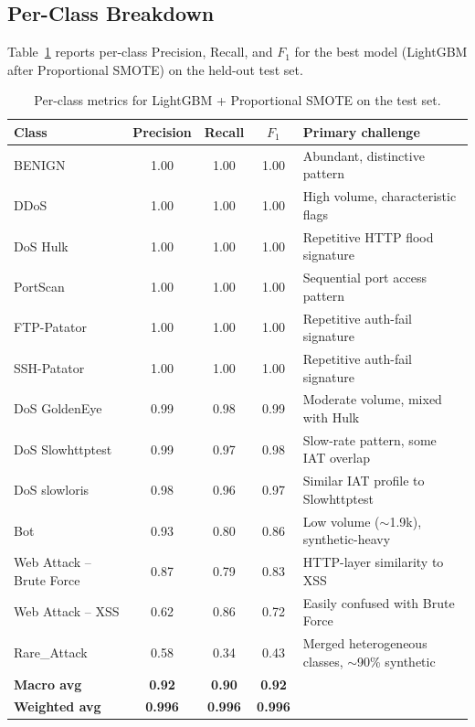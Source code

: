 \subsection{Per-Class Breakdown}
\label{sec:exp-per-class}

Table~\ref{tab:per-class} reports per-class Precision, Recall, and $F_1$ for the best model (LightGBM after Proportional SMOTE) on the held-out test set.

\begin{table}[h]
\centering
\caption{Per-class metrics for LightGBM + Proportional SMOTE on the test set.}
\label{tab:per-class}
\begin{tabular}{lcccl}
\toprule
\textbf{Class} & \textbf{Precision} & \textbf{Recall} & \textbf{$F_1$} & \textbf{Primary challenge} \\
\midrule
BENIGN                   & 1.00 & 1.00 & 1.00 & Abundant, distinctive pattern \\
DDoS                     & 1.00 & 1.00 & 1.00 & High volume, characteristic flags \\
DoS Hulk                 & 1.00 & 1.00 & 1.00 & Repetitive HTTP flood signature \\
PortScan                 & 1.00 & 1.00 & 1.00 & Sequential port access pattern \\
FTP-Patator              & 1.00 & 1.00 & 1.00 & Repetitive auth-fail signature \\
SSH-Patator              & 1.00 & 1.00 & 1.00 & Repetitive auth-fail signature \\
DoS GoldenEye            & 0.99 & 0.98 & 0.99 & Moderate volume, mixed with Hulk \\
DoS Slowhttptest         & 0.99 & 0.97 & 0.98 & Slow-rate pattern, some IAT overlap \\
DoS slowloris            & 0.98 & 0.96 & 0.97 & Similar IAT profile to Slowhttptest \\
Bot                      & 0.93 & 0.80 & 0.86 & Low volume ($\sim$1.9k), synthetic-heavy \\
Web Attack -- Brute Force & 0.87 & 0.79 & 0.83 & HTTP-layer similarity to XSS \\
Web Attack -- XSS        & 0.62 & 0.86 & 0.72 & Easily confused with Brute Force \\
Rare\_Attack             & 0.58 & 0.34 & 0.43 & Merged heterogeneous classes, $\sim$90\% synthetic \\
\midrule
\textbf{Macro avg}       & \textbf{0.92} & \textbf{0.90} & \textbf{0.92} & \\
\textbf{Weighted avg}    & \textbf{0.996} & \textbf{0.996} & \textbf{0.996} & \\
\bottomrule
\end{tabular}
\end{table}

